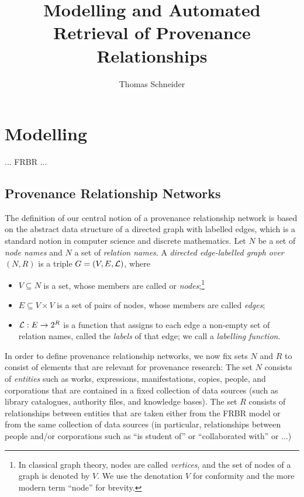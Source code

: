 \documentclass[11pt,DIV=11,a4paper]{scrartcl}
\title{Modelling and Automated Retrieval of Provenance Relationships}
\author{Thomas Schneider}
\begin{document}
  \maketitle

  \section{Modelling}
  
  ... FRBR ...
  
  \subsection{Provenance Relationship Networks}
  
  The definition of our central notion of a provenance relationship network
  is based on the abstract data structure of a directed graph with labelled edges,
  which is a standard notion in computer science and discrete mathematics.
  Let $N$ be a set of \emph{node names} and $N$ a set of \emph{relation names}.
  A \emph{directed edge-labelled graph over $(N,R)$} is a triple $G = (V,E,\mathcal{L})$,
  where
  \begin{itemize}
    \item
      $V \subseteq N$ is a set, whose members are called or \emph{nodes};\footnote{%
        In classical graph theory, nodes are called \emph{vertices}, and the set of
        nodes of a graph is denoted by $V$. We use the denotation $V$ for conformity
        and the more modern term ``node'' for brevity.%
      }      
    \item 
      $E \subseteq V \times V$ is a set of pairs of nodes, whose members are called \emph{edges};
    \item
      $\mathcal{L} : E \to 2^R$ is a function that assigns to each edge a non-empty set of relation names,
      called the \emph{labels} of that edge; we call \Lmc a \emph{labelling function}.
  \end{itemize}
  
  In order to define provenance relationship networks, we now fix sets $N$ and $R$ to consist
  of elements that are relevant for provenance research:
  The set $N$ consists of \emph{entities} such as 
  works, expressions, manifestations, copies, people, and corporations
  that are contained in a fixed collection of data sources (such as library catalogues,
  authority files, and knowledge bases). The set $R$ consists of relationships
  between entities that are taken either from the FRBR model
  or from the same collection of data sources (in particular, relationships between people and/or corporations
  such as ``is student of'' or ``collaborated with'' or ...)
  
\end{document}
